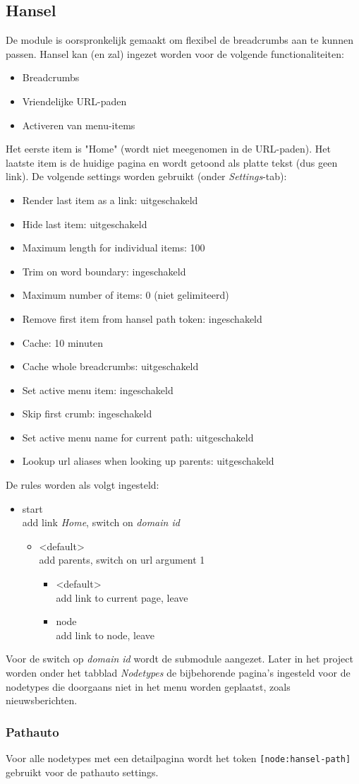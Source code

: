 \subsection{Hansel}

De module  is oorspronkelijk gemaakt om flexibel de breadcrumbs aan te kunnen passen. Hansel kan (en zal) ingezet worden voor de volgende functionaliteiten:
\begin{itemize}
\item Breadcrumbs
\item Vriendelijke URL-paden
\item Activeren van menu-items
\end{itemize}
Het eerste item is "Home" (wordt niet meegenomen in de URL-paden). Het laatste item is de huidige pagina en wordt getoond als platte tekst (dus geen link). De volgende settings worden gebruikt (onder \emph{Settings}-tab):
\begin{itemize}
\item Render last item as a link: uitgeschakeld
\item Hide last item: uitgeschakeld
\item Maximum length for individual items: 100
\item Trim on word boundary: ingeschakeld
\item Maximum number of items: 0 (niet gelimiteerd)
\item Remove first item from hansel path token: ingeschakeld
\item Cache: 10 minuten
\item Cache whole breadcrumbs: uitgeschakeld
\item Set active menu item: ingeschakeld
\item Skip first crumb: ingeschakeld
\item Set active menu name for current path: uitgeschakeld
\item Lookup url aliases when looking up parents: uitgeschakeld
\end{itemize}
De rules worden als volgt ingesteld:
\begin{itemize}
\item start \\ add link \emph{Home}, switch on \emph{domain id}
\begin{itemize}
\item \textless default\textgreater \\  add parents, switch on url argument 1
\begin{itemize}
\item \textless default\textgreater \\ add link to current page, leave
\item node \\ add link to node, leave
\end{itemize}
\end{itemize}
\end{itemize}
Voor de switch op \emph{domain id} wordt de submodule  aangezet.
Later in het project worden onder het tabblad \emph{Nodetypes} de bijbehorende pagina's ingesteld voor de nodetypes die doorgaans niet in het menu worden geplaatst, zoals nieuwsberichten.

\subsubsection{Pathauto}
Voor alle nodetypes met een detailpagina wordt het token \texttt{[node:hansel-path]} gebruikt voor de pathauto settings.

